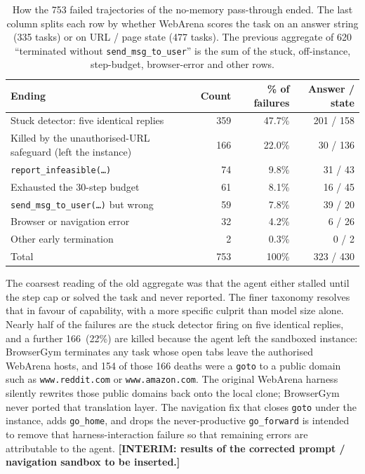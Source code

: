 \begin{itemize}
\begin{table}[t]
\centering
\begin{tabular}{@{}lrrr@{}}
\toprule
\textbf{Ending} & \textbf{Count} & \textbf{\% of failures} & \textbf{Answer / state} \\
\midrule
Stuck detector: five identical replies & 359 & 47.7\% & 201 / 158 \\
Killed by the unauthorised-URL safeguard (left the instance) & 166 & 22.0\% & 30 / 136 \\
\texttt{report\_infeasible(\dots)} & 74 & 9.8\% & 31 / 43 \\
Exhausted the 30-step budget & 61 & 8.1\% & 16 / 45 \\
\texttt{send\_msg\_to\_user(\dots)} but wrong & 59 & 7.8\% & 39 / 20 \\
Browser or navigation error & 32 & 4.2\% & 6 / 26 \\
Other early termination & 2 & 0.3\% & 0 / 2 \\
\midrule
Total & 753 & 100\% & 323 / 430 \\
\end{tabular}
\caption{How the 753 failed trajectories of the no-memory pass-through ended. The last column splits each row by whether WebArena scores the task on an answer string (335 tasks) or on URL / page state (477 tasks). The previous aggregate of 620 ``terminated without \texttt{send\_msg\_to\_user}'' is the sum of the stuck, off-instance, step-budget, browser-error and other rows.}
\label{tab:failure-endings}
\end{table}

The coarsest reading of the old aggregate was that the agent either stalled until the step cap or solved the task and never reported. The finer taxonomy resolves that in favour of capability, with a more specific culprit than model size alone. Nearly half of the failures are the stuck detector firing on five identical replies, and a further 166~(22\%) are killed because the agent left the sandboxed instance: BrowserGym terminates any task whose open tabs leave the authorised WebArena hosts, and 154 of those 166 deaths were a \texttt{goto} to a public domain such as \texttt{www.reddit.com} or \texttt{www.amazon.com}. The original WebArena harness silently rewrites those public domains back onto the local clone; BrowserGym never ported that translation layer. The navigation fix that closes \texttt{goto} under the instance, adds \texttt{go\_home}, and drops the never-productive \texttt{go\_forward} is intended to remove that harness-interaction failure so that remaining errors are attributable to the agent.
\textbf{[INTERIM: results of the corrected prompt / navigation sandbox to be inserted.]}

\end{itemize}

